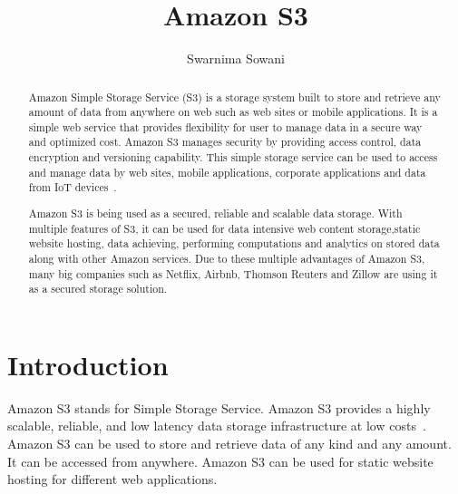
\title{Amazon S3}


\author{Swarnima Sowani}

\renewcommand{\shortauthors}{G. v. Laszewski}

\begin{abstract}

  Amazon Simple Storage Service (S3) is a storage system built to
  store and retrieve any amount of data from anywhere on web such as
  web sites or mobile applications. It is a simple web service that
  provides flexibility for user to manage data in a secure way and
  optimized cost. Amazon S3 manages security by providing access
  control, data encryption and versioning capability. This simple
  storage service can be used to access and manage data by web sites,
  mobile applications, corporate applications and data from IoT
  devices~\cite{hid-sp18-420-amazon-S3}.


  Amazon S3 is being used as a secured, reliable and scalable data
  storage. With multiple features of S3, it can be used for data
  intensive web content storage,static website hosting, data
  achieving, performing computations and analytics on stored data
  along with other Amazon services. Due to these multiple advantages
  of Amazon S3, many big companies such as Netflix, Airbnb, Thomson
  Reuters and Zillow are using it as a secured storage solution.


\end{abstract}


\maketitle

\section{Introduction}

Amazon S3 stands for Simple Storage Service. Amazon S3 provides a
highly scalable, reliable, and low latency data storage infrastructure
at low costs~\cite{hid-sp18-420-amazon-S3-FAQ}. Amazon S3 can be used
to store and retrieve data of any kind and any amount. It can be
accessed from anywhere.  Amazon S3 can be used for static website
hosting for different web applications.

